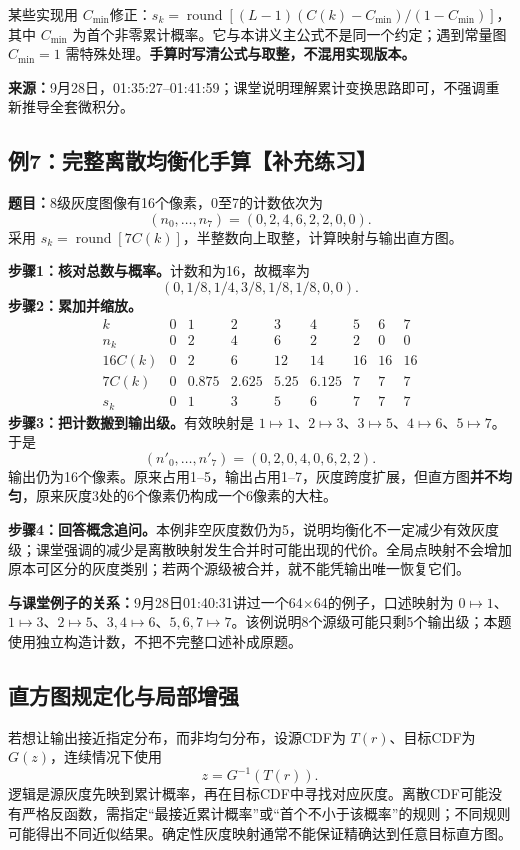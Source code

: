 某些实现用 $C_{\min}$修正：$s_k=\operatorname{round}[(L-1)(C(k)-C_{\min})/(1-C_{\min})]$，其中 $C_{\min}$ 为首个非零累计概率。它与本讲义主公式不是同一个约定；遇到常量图 $C_{\min}=1$ 需特殊处理。\textbf{手算时写清公式与取整，不混用实现版本。}

\noindent\textbf{来源：}9月28日，01:35:27--01:41:59；课堂说明理解累计变换思路即可，不强调重新推导全套微积分。

\subsection{例7：完整离散均衡化手算【补充练习】}
\textbf{题目：}8级灰度图像有16个像素，0至7的计数依次为
\[
(n_0,\ldots,n_7)=(0,2,4,6,2,2,0,0).
\]
采用 $s_k=\operatorname{round}[7C(k)]$，半整数向上取整，计算映射与输出直方图。

\textbf{步骤1：核对总数与概率。}计数和为16，故概率为
\[
(0,1/8,1/4,3/8,1/8,1/8,0,0).
\]
\textbf{步骤2：累加并缩放。}
\[
\begin{array}{c|rrrrrrrr}
k&0&1&2&3&4&5&6&7\\\hline
n_k&0&2&4&6&2&2&0&0\\
16C(k)&0&2&6&12&14&16&16&16\\
7C(k)&0&0.875&2.625&5.25&6.125&7&7&7\\
s_k&0&1&3&5&6&7&7&7
\end{array}
\]
\textbf{步骤3：把计数搬到输出级。}有效映射是 $1\mapsto1$、$2\mapsto3$、$3\mapsto5$、$4\mapsto6$、$5\mapsto7$。于是
\[
(n'_0,\ldots,n'_7)=(0,2,0,4,0,6,2,2).
\]
输出仍为16个像素。原来占用1--5，输出占用1--7，灰度跨度扩展，但直方图\textbf{并不均匀}，原来灰度3处的6个像素仍构成一个6像素的大柱。

\textbf{步骤4：回答概念追问。}本例非空灰度数仍为5，说明均衡化不一定减少有效灰度级；课堂强调的减少是离散映射发生合并时可能出现的代价。全局点映射不会增加原本可区分的灰度类别；若两个源级被合并，就不能凭输出唯一恢复它们。

\textbf{与课堂例子的关系：}9月28日01:40:31讲过一个64$\times$64的例子，口述映射为 $0\mapsto1$、$1\mapsto3$、$2\mapsto5$、$3,4\mapsto6$、$5,6,7\mapsto7$。该例说明8个源级可能只剩5个输出级；本题使用独立构造计数，不把不完整口述补成原题。

\subsection{直方图规定化与局部增强}
若想让输出接近指定分布，而非均匀分布，设源CDF为 $T(r)$、目标CDF为 $G(z)$，连续情况下使用
\begin{equation}
z=G^{-1}(T(r)).
\end{equation}
逻辑是源灰度先映到累计概率，再在目标CDF中寻找对应灰度。离散CDF可能没有严格反函数，需指定“最接近累计概率”或“首个不小于该概率”的规则；不同规则可能得出不同近似结果。确定性灰度映射通常不能保证精确达到任意目标直方图。

